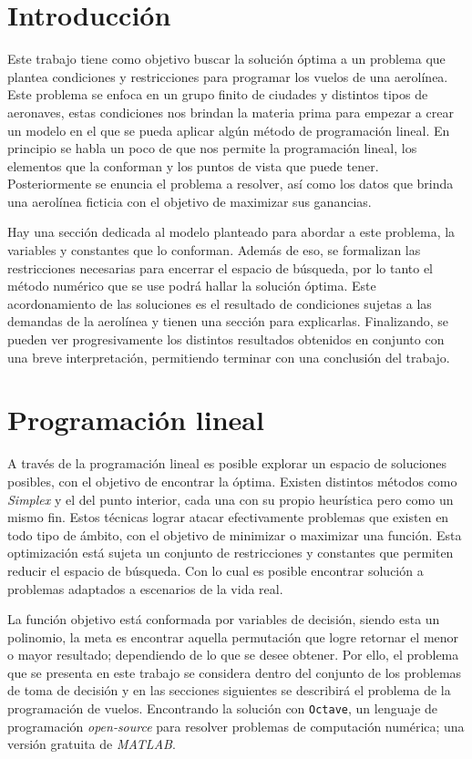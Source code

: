 \documentclass[12pt]{article}
\begin{document}
\section{Introducción}

Este trabajo tiene como objetivo buscar la solución óptima a un problema que plantea condiciones y restricciones para programar los vuelos de una aerolínea. Este problema se enfoca en un grupo finito de ciudades y distintos tipos de aeronaves, estas condiciones nos brindan la materia prima para empezar a crear un modelo en el que se pueda aplicar algún método de programación lineal. En principio se habla un poco de que nos permite la programación lineal, los elementos que la conforman y los puntos de vista que puede tener. Posteriormente se enuncia el problema a resolver, así como los datos que brinda una aerolínea ficticia con el objetivo de maximizar sus ganancias.

Hay una sección dedicada al modelo planteado para abordar a este problema, la variables y constantes que lo conforman. Además de eso, se formalizan las restricciones necesarias para encerrar el espacio de búsqueda, por lo tanto el método numérico que se use podrá hallar la solución óptima. Este acordonamiento de las soluciones es el resultado de condiciones sujetas a las demandas de la aerolínea y tienen una sección para explicarlas. Finalizando, se pueden ver progresivamente los distintos resultados obtenidos en conjunto con una breve interpretación, permitiendo terminar con una conclusión del trabajo.

\newpage

\section{Programación lineal}

A través de la programación lineal es posible explorar un espacio de soluciones posibles, con el objetivo de encontrar la óptima. Existen distintos métodos como \emph{Simplex} y el del punto interior, cada una con su propio heurística pero como un mismo fin. Estos técnicas lograr atacar efectivamente problemas que existen en todo tipo de ámbito, con el objetivo de minimizar o maximizar una función. Esta optimización está sujeta un conjunto de restricciones y constantes que permiten reducir el espacio de búsqueda. Con lo cual es posible encontrar solución a problemas adaptados a escenarios de la vida real.

La función objetivo está conformada por variables de decisión, siendo esta un polinomio, la meta es encontrar aquella permutación que logre retornar el menor o mayor resultado; dependiendo de lo que se desee obtener. Por ello, el problema que se presenta en este trabajo se considera dentro del conjunto de los problemas de toma de decisión y en las secciones siguientes se describirá el problema de la programación de vuelos. Encontrando la solución con \texttt{Octave}, un lenguaje de programación \emph{open-source} para resolver problemas de computación numérica; una versión gratuita de \emph{MATLAB}.
\end{document}
